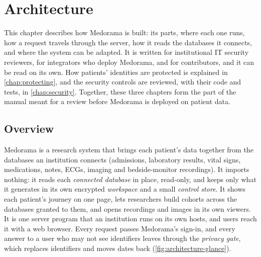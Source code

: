 \chapter{Architecture}
\label{chap:architecture}

This chapter describes how Medorama is built: its parts, where each one runs, how a request
travels through the server, how it reads the databases it connects, and where the system can be
adapted. It is written
for institutional IT security reviewers, for integrators who deploy Medorama, and for
contributors, and it can be read on its own. How patients' identities are protected is explained
in \cref{chap:protecting}, and the security controls are reviewed, with their code and tests, in
\cref{chap:security}. Together, these three chapters form the part of the manual meant for a
review before Medorama is deployed on patient data.

\section{Overview}
\label{sec:architecture-overview}

Medorama is a research system that brings each patient's data together from the databases an
institution connects (admissions, laboratory results, vital signs, medications, notes, ECGs,
imaging and bedside-monitor recordings). It imports nothing: it reads each \emph{connected
database} in place, read-only, and keeps only what it generates in its own encrypted
\emph{workspace} and a small \emph{control store}. It shows each patient's journey on one page,
lets researchers build cohorts across the databases granted to them, and opens recordings and
images in its own viewers. It is one server program that an institution runs on its own hosts, and users
reach it with a web browser. Every request passes Medorama's sign-in, and every answer to a user
who may not see identifiers leaves through the \emph{privacy gate}, which replaces identifiers
and moves dates back (\cref{fig:architecture-glance}).

